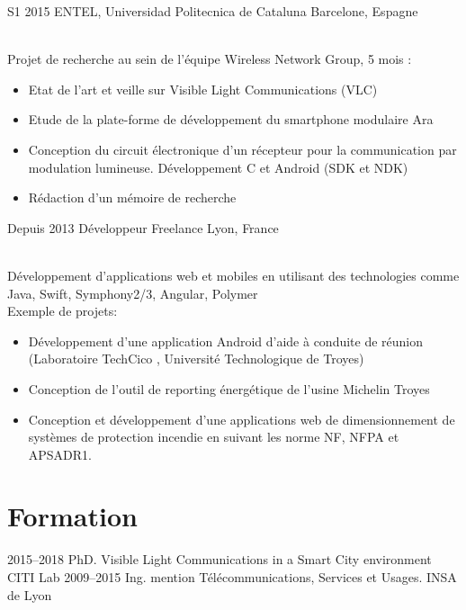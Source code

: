\documentclass[]{cv-style}          %
\begin{document}
\begin{entrylist}
 \entry
  {S1 2015 }
  {ENTEL, Universidad Politecnica de Cataluna}
  {Barcelone, Espagne}
  {\\
  Projet de recherche au sein de l'équipe Wireless Network Group, 5 mois :
  \begin{itemize}
    \item Etat de l'art et veille sur Visible Light Communications (VLC)
    \item Etude de la plate-forme de développement du smartphone modulaire Ara
    \item Conception du circuit électronique d'un récepteur pour la communication par modulation lumineuse. Développement C et Android (SDK et NDK)
	\item Rédaction d'un mémoire de recherche
  \end{itemize}}
\entry
  {Depuis 2013}
  {Développeur Freelance}
  {Lyon, France}
  {\\
  Développement d'applications web et mobiles en utilisant des technologies comme Java, Swift, Symphony2/3, Angular, Polymer\\
  Exemple de projets:
  \begin{itemize}
    \item Développement d'une application Android d'aide à conduite de réunion \\ (Laboratoire TechCico , Université Technologique de Troyes)
    \item Conception de l’outil de reporting énergétique de l'usine Michelin Troyes
    \item Conception et développement d'une applications web de dimensionnement de systèmes de protection incendie en suivant les norme NF, NFPA et APSADR1.
  \end{itemize}}
\end{entrylist}


\section{Formation}

\begin{entrylist}
\entry
{2015--2018}
{PhD. {\normalfont Visible Light Communications in a Smart City environment}}
{CITI Lab}
{}
\entry
{2009--2015}
{Ing. {\normalfont mention Télécommunications, Services et Usages.}}
{INSA de Lyon}
{ \\
}
\end{entrylist}
\end{document}
